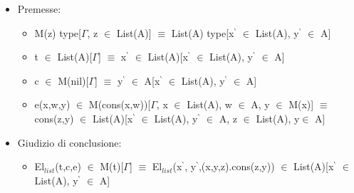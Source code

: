 \begin{itemize}
\item Premesse:
\begin{itemize}
\item M(z) type[$\Gamma$, z $\in$ List(A)] $\equiv$ List(A) type[x$^\backprime$ $\in$ List(A), y$^\backprime$ $\in$ A]
\item t $\in$ List(A)[$\Gamma$] $\equiv$ x$^\backprime$ $\in$ List(A)[x$^\backprime$ $\in$ List(A), y$^\backprime$ $\in$ A]
\item c $\in$ M(nil)[$\Gamma$] $\equiv$ y$^\backprime$ $\in$ A[x$^\backprime$ $\in$ List(A), y$^\backprime$ $\in$ A]
\item e(x,w,y) $\in$ M(cons(x,w))[$\Gamma$, x $\in$ List(A),  w $\in$ A, y $\in$ M(x)] $\equiv$
cons(z,y) $\in$ List(A)[x$^\backprime$ $\in$ List(A), y$^\backprime$ $\in$ A, z $\in$ List(A), y$\in$ A]
\end{itemize}
\noindent
\item Giudizio di conclusione:
\begin{itemize}
\item El$_{list}$(t,c,e) $\in$ M(t)[$\Gamma$] $\equiv$ El$_{list}$(x$^\backprime$, y$^\backprime$,(x,y,z).cons(z,y)) $\in$ List(A)[x$^\backprime$ $\in$ List(A), y$^\backprime$ $\in$ A]
\end{itemize}
\end{itemize}

